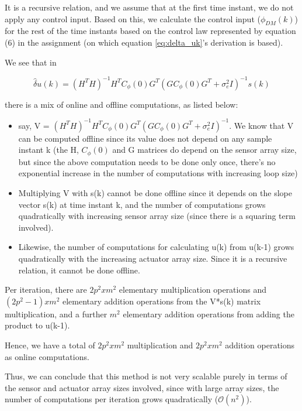 \documentclass[12pt]{report}
\begin{document}
It is a recursive relation, and we assume that at the first time instant, we do not apply any control input. Based on this, we calculate the control input ($\phi_{DM}(k)$) for the rest of the time instants based on the control law represented by equation (6) in the assignment (on which equation \ref{eq:delta_uk}'s derivation is based).

We see that in

\begin{equation*}
\hat\delta u(k) = (H^{T}H)^{-1}H^{T}C_{\phi}(0)G^{T}(GC_{\phi}(0)G^{T} + \sigma_{e}^{2}I)^{-1}s(k)
\end{equation*}

there is a mix of online and offline computations, as listed below:

\begin{itemize}
	\item say, V = $ (H^{T}H)^{-1}H^{T}C_{\phi}(0)G^{T}(GC_{\phi}(0)G^{T} + \sigma_{e}^{2}I)^{-1}$. We know that V can be computed offline since its value does not depend on any sample instant k (the H, $C_{\phi}(0)$ and G matrices do depend on the sensor array size, but since the above computation needs to be done only once, there's no exponential increase in the number of computations with increasing loop size)
	\item Multiplying V with s(k) cannot be done offline since it depends on the slope vector s(k) at time instant k, and the number of computations grows quadratically with increasing sensor array size (since there is a squaring term involved).
	\item Likewise, the number of computations for calculating u(k) from u(k-1) grows quadratically with the increasing actuator array size. Since it is a recursive relation, it cannot be done offline.
\end{itemize}

Per iteration, there are $2p^{2}x m^2$ elementary multiplication operations and $(2p^{2} - 1)x m^2$ elementary addition operations from the V*s(k) matrix multiplication, and a further $m^2$ elementary addition operations from adding the product to u(k-1).

Hence, we have a total of $2p^{2}x m^2$ multiplication and $2p^{2}x m^2$ addition operations as online computations.

Thus, we can conclude that this method is not very scalable purely in terms of the sensor and actuator array sizes involved, since with large array sizes, the number of computations per iteration grows quadratically ($\mathcal{O}(n^2)$).
\end{document}
